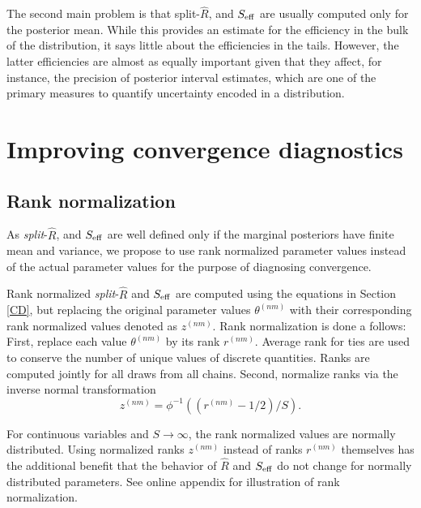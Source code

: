 \documentclass[american,]{article}
\begin{document}
The second main problem is that split-\(\widehat{R}\), and \(S_{\rm eff}\) are 
usually computed only for the posterior mean. While this provides an estimate 
for the efficiency in the bulk of the distribution, it says little about the 
efficiencies in the tails. However, the latter efficiencies are almost as 
equally important given that they affect, for instance, the precision of posterior 
interval estimates, which are one of the primary measures to quantify uncertainty 
encoded in a distribution.

\hypertarget{improving-convergence-diagnostics}{%
\section{Improving convergence
diagnostics}\label{improving-convergence-diagnostics}}

\hypertarget{rank-normalization}{%
\subsection{Rank normalization}\label{rank-normalization}}

As \emph{split}-\(\widehat{R}\), and \(S_{\rm eff}\) are well defined
only if the marginal posteriors have finite mean and variance, we
propose to use rank normalized parameter values instead of the actual
parameter values for the purpose of diagnosing convergence.

Rank normalized \emph{split}-\(\widehat{R}\) and \(S_{\rm eff}\) are
computed using the equations in Section \ref{CD}, but
replacing the original parameter values \(\theta^{(nm)}\) with their
corresponding rank normalized values denoted as \(z^{(nm)}\). Rank
normalization is done a follows: First, replace each value
\(\theta^{(nm)}\) by its rank \(r^{(nm)}\). Average rank for ties are
used to conserve the number of unique values of discrete quantities.
Ranks are computed jointly for all draws from all chains. Second,
normalize ranks via the inverse normal transformation
\begin{equation}
z^{(nm)} = \phi^{-1}((r^{(nm)}-1/2)/S).
\end{equation}

For continuous variables and \(S \rightarrow \infty\), the rank
normalized values are normally distributed. Using normalized ranks
\(z^{(nm)}\) instead of ranks \(r^{(nm)}\) themselves has the additional
benefit that the behavior of \(\widehat{R}\) and \(S_{\rm eff}\) do
not change for normally distributed parameters.
See online appendix for illustration of rank normalization.
\end{document}

